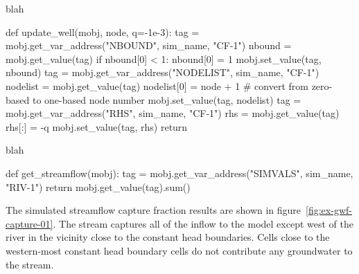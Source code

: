 blah 

\begin{python}
def update_well(mobj, node, q=-1e-3):
    tag = mobj.get_var_address("NBOUND", sim_name, "CF-1")
    nbound = mobj.get_value(tag)
    if nbound[0] < 1:
        nbound[0] = 1
        mobj.set_value(tag, nbound)
    tag = mobj.get_var_address("NODELIST", sim_name, "CF-1")
    nodelist = mobj.get_value(tag)
    nodelist[0] = node + 1 # convert from zero-based to one-based node number
    mobj.set_value(tag, nodelist)
    tag = mobj.get_var_address("RHS", sim_name, "CF-1")
    rhs = mobj.get_value(tag)
    rhs[:] = -q
    mobj.set_value(tag, rhs)
    return
\end{python}

blah

\begin{python}
def get_streamflow(mobj):
    tag = mobj.get_var_address("SIMVALS", sim_name, "RIV-1")
    return mobj.get_value(tag).sum()
\end{python}

The simulated streamflow capture fraction results are shown in figure~\ref{fig:ex-gwf-capture-01}. The stream captures all of the inflow to the model except west of the river in the vicinity close to the constant head boundaries. Cells close to the western-most constant head boundary cells do not contribute any groundwater to the stream.


